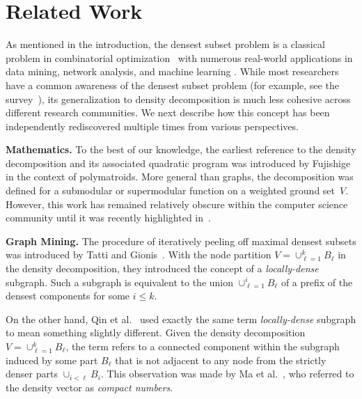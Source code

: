 \section{Related Work}

As mentioned in the introduction,
the densest subset problem is a classical problem in combinatorial optimization~\cite{goldberg1984finding} with numerous real-world applications in data mining, network analysis, and machine learning \cite{10.1007/3-540-44436-X_10, khuller2009finding, ma2020efficient, angel2012dense, shin2016corescope, li2020flowscope}.
While most researchers have a common awareness of the densest subset problem (for example, see the survey~\cite{DBLP:journals/csur/LancianoMFB24}), its generalization to density decomposition is much less cohesive across different research communities. We next describe how this concept has been independently rediscovered multiple times from various perspectives.


\noindent \textbf{Mathematics.}
To the best of our knowledge, the earliest reference to the density decomposition and its associated quadratic program was introduced by Fujishige~\cite{fujishige1980lexicographically} in the context of polymatroids. More general than graphs, the decomposition was defined for a submodular or supermodular function on a weighted ground set~$V$. However, this work has remained relatively obscure within the computer science community until it was recently highlighted in~\cite{DBLP:conf/soda/ChekuriQT22,DBLP:conf/nips/HarbQC22}.


\noindent \textbf{Graph Mining.}  The procedure of iteratively
peeling off maximal densest subsets was introduced by
Tatti and Gionis~\cite{tatti2015density, tatti2019density}.
With the node partition $V = \cup_{\ell = 1}^k B_\ell$ in the density decomposition, they introduced the concept of a \emph{locally-dense} subgraph. 
Such a subgraph is equivalent to the union $\cup_{\ell = 1}^i B_\ell$ of a prefix of the densest components for some $i \leq k$.

On the other hand, Qin et al.~\cite{DBLP:conf/kdd/QinLCZ15}
used exactly the same term \emph{locally-dense} subgraph to mean
something slightly different.  Given the density
decomposition $V = \cup_{\ell = 1}^k B_\ell$,
the term refers to a connected component within the subgraph induced
by some part $B_\ell$ that is not adjacent to any node from
the strictly denser parts $\cup_{i < \ell} B_i$.
This observation was made by Ma et al.~\cite{DBLP:journals/pvldb/MaCLH22},
who referred to the density vector as \emph{compact numbers}.

